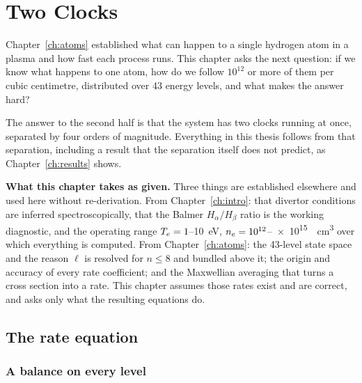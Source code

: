 
\chapter{Two Clocks}
\label{ch:theory}

Chapter~\ref{ch:atoms} established what can happen to a single hydrogen atom in
a plasma and how fast each process runs. This chapter asks the next question: if
we know what happens to one atom, how do we follow $10^{12}$ or more of them per
cubic centimetre, distributed over 43 energy levels, and what makes the answer
hard?

The answer to the second half is that the system has two clocks running at
once, separated by four orders of magnitude. Everything in this thesis follows
from that separation, including a result that the separation itself does not
predict, as Chapter~\ref{ch:results} shows.

\medskip
\noindent\textbf{What this chapter takes as given.} Three things are established
elsewhere and used here without re-derivation. From Chapter~\ref{ch:intro}: that
divertor conditions are inferred spectroscopically, that the Balmer
$H_\alpha/H_\beta$ ratio is the working diagnostic, and the operating range
$T_e = 1$--\SI{10}{\electronvolt}, $n_e = 10^{12}$--\SI{e15}{\per\cubic\centi\metre}
over which everything is computed. From Chapter~\ref{ch:atoms}: the 43-level
state space and the reason $\ell$ is resolved for $n \le 8$ and bundled above it;
the origin and accuracy of every rate coefficient; and the Maxwellian averaging
that turns a cross section into a rate. This chapter assumes those rates exist
and are correct, and asks only what the resulting equations do.

\section{The rate equation}
\label{sec:rate_equation}

\subsection{A balance on every level}

